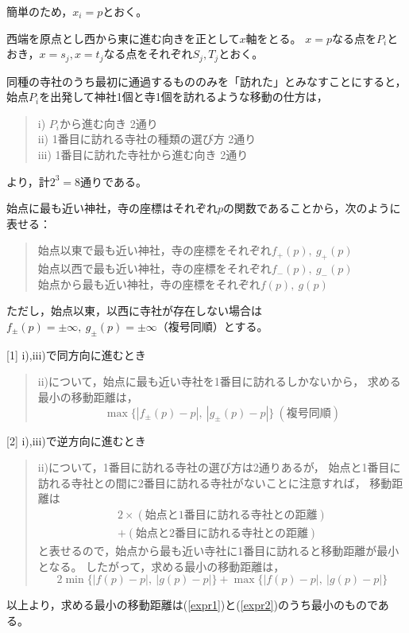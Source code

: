 \documentclass{article}
\begin{document}
簡単のため，$x_i = p$とおく。

西端を原点とし西から東に進む向きを正として$x$軸をとる。
$x = p$なる点を$P_i$とおき，$x = s_j, x = t_j$なる点をそれぞれ$S_j, T_j$とおく。

同種の寺社のうち最初に通過するもののみを「訪れた」とみなすことにすると，
始点$P_i$を出発して神社1個と寺1個を訪れるような移動の仕方は，
\begin{quote}
    i) $P_i$から進む向き 2通り \\
    ii) 1番目に訪れる寺社の種類の選び方 2通り \\
    iii) 1番目に訪れた寺社から進む向き 2通り
\end{quote}
より，計$2^3 = 8$通りである。

始点に最も近い神社，寺の座標はそれぞれ$p$の関数であることから，次のように表せる：
\begin{quote}
    始点以東で最も近い神社，寺の座標をそれぞれ$f_+(p),\ g_+(p)$ \\
    始点以西で最も近い神社，寺の座標をそれぞれ$f_-(p),\ g_-(p)$ \\
    始点から最も近い神社，寺の座標をそれぞれ$f(p),\ g(p)$
\end{quote}

ただし，始点以東，以西に寺社が存在しない場合は$f_\pm(p) = \pm\infty,\ g_\pm(p) = \pm\infty$（複号同順）とする。

[1] i),iii)で同方向に進むとき
\begin{quote}
    ii)について，始点に最も近い寺社を1番目に訪れるしかないから，
    求める最小の移動距離は，
    \begin{equation}
        \label{expr1}
        \max\{ |f_\pm(p) - p|,\ |g_\pm(p) - p| \} \ (\mbox{複号同順})
    \end{equation}
\end{quote}

[2] i),iii)で逆方向に進むとき
\begin{quote}
ii)について，1番目に訪れる寺社の選び方は2通りあるが，
始点と1番目に訪れる寺社との間に2番目に訪れる寺社がないことに注意すれば，
移動距離は
\begin{eqnarray*}
    2 \times (\mbox{始点と1番目に訪れる寺社との距離}) \\
           + (\mbox{始点と2番目に訪れる寺社との距離})
\end{eqnarray*}
と表せるので，始点から最も近い寺社に1番目に訪れると移動距離が最小となる。
したがって，求める最小の移動距離は，
\begin{equation}
    \label{expr2}
    2 \min\{ |f(p) - p|,\ |g(p) - p| \} + \max\{ |f(p) - p|,\ |g(p) - p| \}
\end{equation}
\end{quote}

以上より，求める最小の移動距離は(\ref{expr1})と(\ref{expr2})のうち最小のものである。
\end{document}
